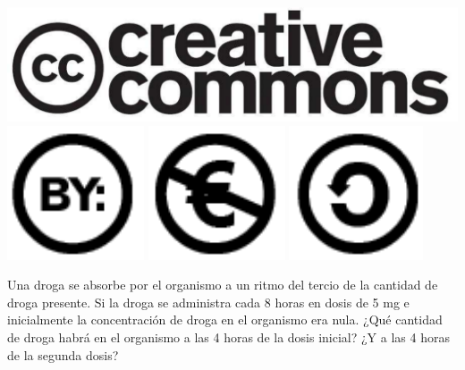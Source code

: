 \documentclass[aspectratio=149,10pt,xcolor=dvipsnames,t]{beamer}
\begin{document}
\begin{frame}[c]
\begin{center}
\biskip
\includegraphics[scale=0.07]{img/cc-logo}
\includegraphics[scale=0.2]{img/cc-by}
\includegraphics[scale=0.2]{img/cc-e}
\includegraphics[scale=0.2]{img/cc-c}
\end{center}
\end{frame}

\begin{frame}[c]
Una droga se absorbe por el organismo a un ritmo del tercio de la cantidad de droga presente. 
Si la droga se administra cada 8 horas en dosis de 5 mg e inicialmente la concentración de droga en el organismo era nula.
¿Qué cantidad de droga habrá en el organismo a las 4 horas de la dosis inicial? ¿Y a las 4 horas de la segunda dosis? 
\end{frame}
\end{document}
